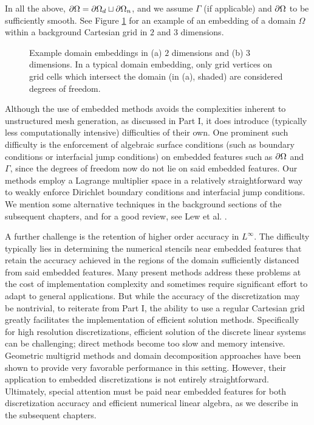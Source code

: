 In all the above, $\partial\Omega = \partial\Omega_d \sqcup \partial\Omega_n$, and we assume $\Gamma$ (if applicable) and $\partial\Omega$ to be sufficiently smooth. See Figure \ref{fig:pt2.embedding} for an example of an embedding of a domain $\Omega$ within a background Cartesian grid in $2$ and $3$ dimensions.

\newlength\embeddingfigureheight
\setlength{}
\begin{figure}[htbp]
\begin{center}
\caption{Example domain embeddings in (a) $2$ dimensions and (b) $3$ dimensions. In a typical domain embedding, only grid vertices on grid cells which intersect the domain (in (a), shaded) are considered degrees of freedom.}
\label{fig:pt2.embedding}
\end{center}
\end{figure}

Although the use of embedded methods avoids the complexities inherent to unstructured mesh generation, as discussed in Part I, it does introduce (typically less computationally intensive) difficulties of their own. One prominent such difficulty is the enforcement of algebraic surface conditions (such as boundary conditions or interfacial jump conditions) on embedded features such as $\partial\Omega$ and $\Gamma$, since the degrees of freedom now do not lie on said embedded features. Our methods employ a Lagrange multiplier space in a relatively straightforward way to weakly enforce Dirichlet boundary conditions and interfacial jump conditions. We mention some alternative techniques in the background sections of the subsequent chapters, and for a good review, see Lew et al. \cite{Lew.Adrian08}.

A further challenge is the retention of higher order accuracy in $L^{\infty}$. The difficulty typically lies in determining the numerical stencils near embedded features that retain the accuracy achieved in the regions of the domain sufficiently distanced from said embedded features. Many present methods address these problems at the cost of implementation complexity and sometimes require significant effort to adapt to general applications. But while the accuracy of the discretization may be nontrivial, to reiterate from Part I, the ability to use a regular Cartesian grid greatly facilitates the implementation of efficient solution methods. Specifically for high resolution discretizations, efficient solution of the discrete linear systems can be challenging; direct methods become too slow and memory intensive. Geometric multigrid methods and domain decomposition approaches have been shown to provide very favorable performance in this setting. However, their application to embedded discretizations is not entirely straightforward. Ultimately, special attention must be paid near embedded features for both discretization accuracy and efficient numerical linear algebra, as we describe in the subsequent chapters.

